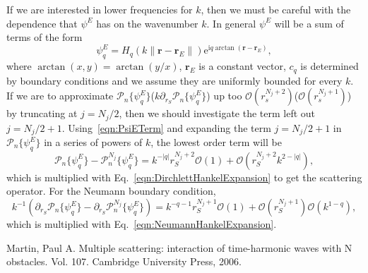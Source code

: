 \documentclass[ 12pt, a4paper]{article}
\newcommand{\be}{\begin{equation}}
\newcommand{\en}{\end{equation}}
\newcommand{\ii}{\textrm{i}}
\newcommand{\ee}{\textrm{e}}
\renewcommand{\vec}[1]{\boldsymbol{#1}}
\begin{document}
If we are interested in lower frequencies for $k$, then we must be careful with the dependence that $\psi^E$ has on the wavenumber $k$. In general $\psi^E$ will be a sum of terms of the form
\be
 \psi^E_q=  H_q (k \|\vec r-\vec r_E\|) \ee^{\ii q \arctan(\vec r - \vec r_E) },
\label{eqn:PsiETerm}
\en
where $\arctan(x,y) = \arctan (y/x)$, $\vec r_E$ is a constant vector, $c_q$ is determined by boundary conditions and we assume they are uniformly bounded for every $k$. If we are to approximate $\mathcal P_n \{\psi^E_q\}$($k \partial_{r_S}\mathcal P_n \{\psi^E_q\}$) up too $\mathcal O ( r_s^{N_j +2})$($\mathcal O ( r_s^{N_j +1})$) by truncating at $j = N_j/2$,  then we should investigate the term left out $j= N_j/2 +1$. Using~\eqref{eqn:PsiETerm} and expanding the term $j= N_j/2+1$ in $\mathcal P_n\{\psi^E_q\}$  in a series of powers of $k$, the lowest order term will be
\be
\mathcal P_n\{\psi^E_q\} -\mathcal P_n^{N_j}\{\psi^E_q\}  = k^{-|q|} r_S^{N_j + 2 } \mathcal O(1) + \mathcal O(r_S^{N_j+2} k^{2 -|q|}),
\en
which is multiplied with Eq.~\eqref{eqn:DirchlettHankelExpansion}
to get the scattering operator.
For the Neumann boundary condition,
\be
k^{-1} \left (\partial_{r_S} \mathcal P_n\{\psi^E_q\} - \partial_{r_S} \mathcal P_n^{N_j}\{\psi^E_q\} \right)  = k^{-q-1} r_S^{N_j + 1 } \mathcal O(1) + \mathcal O(r_S^{N_j+1})\mathcal O( k^{1 - q}),
\en
which is multiplied with Eq.~\eqref{eqn:NeumannHankelExpansion}.

\begin{thebibliography}{9}

  Martin, Paul A. Multiple scattering: interaction of time-harmonic waves with N obstacles. Vol. 107. Cambridge University Press, 2006.

\end{thebibliography}
\end{document}
